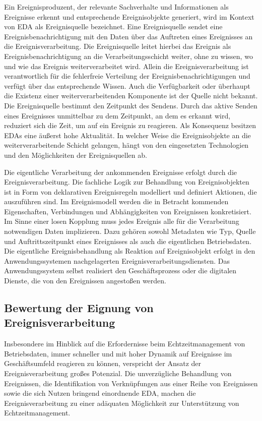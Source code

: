 Ein Ereignisproduzent, der relevante Sachverhalte und Informationen als Ereignisse erkennt und entsprechende Ereignisobjekte generiert, wird im Kontext von \ac{EDA} als Ereignisquelle bezeichnet.  
\cite{Bruns.2010}
Eine Ereignisquelle sendet eine Ereignisbenachrichtigung mit den Daten über das Auftreten eines Ereignisses an die Ereignisverarbeitung. 
Die Ereignisquelle leitet hierbei das Ereignis als Ereignisbenachrichtigung an die Verarbeitungsschicht weiter, ohne zu wissen, wo und wie das Ereignis weiterverarbeitet wird. 
Allein die Ereignisverarbeitung ist verantwortlich für die fehlerfreie Verteilung der Ereignisbenachrichtigungen und verfügt über das entsprechende Wissen. 
Auch die Verfügbarkeit oder überhaupt die Existenz einer weiterverarbeitenden Komponente ist der Quelle nicht bekannt. 
\cite{Bruns.2010}
Die Ereignisquelle bestimmt den Zeitpunkt des Sendens. 
Durch das aktive Senden eines Ereignisses unmittelbar zu dem Zeitpunkt, an dem es erkannt wird, reduziert sich die Zeit, um auf ein Ereignis zu reagieren. 
Als Konsequenz besitzen EDAs eine äußerst hohe Aktualität.
In welcher Weise die Ereignisobjekte an die weiterverarbeitende Schicht gelangen, hängt von den eingesetzten Technologien und den Möglichkeiten der Ereignisquellen ab.
\cite{Hedtstuck.2017}

Die eigentliche Verarbeitung der ankommenden Ereignisse erfolgt durch die Ereignisverarbeitung. 
Die fachliche Logik zur Behandlung von Ereignisobjekten ist in Form von deklarativen Ereignisregeln modelliert und definiert Aktionen, die auszuführen sind. 
Im Ereignismodell werden die in Betracht kommenden Eigenschaften, Verbindungen und Abhängigkeiten von Ereignissen konkretisiert. Im Sinne einer losen Kopplung muss jedes Ereignis alle für die Verarbeitung notwendigen Daten implizieren. Dazu gehören sowohl Metadaten wie Typ, Quelle und Auftrittszeitpunkt eines Ereignisses als auch die eigentlichen Betriebsdaten.
\cite{Bruns.2010}
Die eigentliche Ereignisbehandlung als Reaktion auf Ereignisobjekt erfolgt in den Anwendungssystemen nachgelagerten Ereignisverarbeitungsdiensten. 
Das Anwendungssystem selbst realisiert den Geschäftsprozess oder die digitalen Dienste, die von den Ereignissen angestoßen werden. 
\cite{Muhl.2006}

\subsection{Bewertung der Eignung von Ereignisverarbeitung}
Insbesondere im Hinblick auf die Erfordernisse beim Echtzeitmanagement von Betriebsdaten, immer schneller und mit hoher Dynamik auf Ereignisse im Geschäftsumfeld reagieren zu können, verspricht der Ansatz der Ereignisverarbeitung großes Potenzial.
Die unverzügliche Behandlung von Ereignissen, die Identifikation von Verknüpfungen aus einer Reihe von Ereignissen sowie die sich Nutzen bringend einordnende \ac{EDA}, machen die Ereignisverarbeitung zu einer adäquaten Möglichkeit zur Unterstützung von Echtzeitmanagement.
\cite{Vidackovic.2010} 

